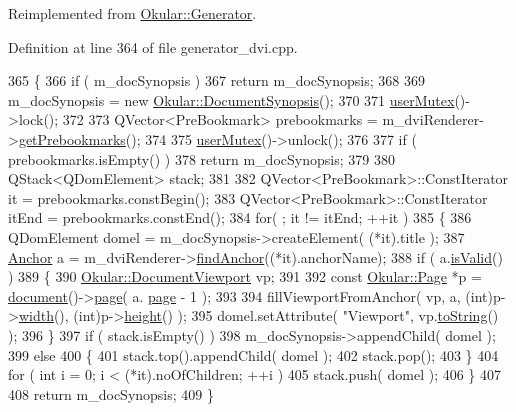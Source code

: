 Reimplemented from \hyperlink{classOkular_1_1Generator_a1f8b31c19d7a5101cadf3fe3186ab0f1}{Okular\+::\+Generator}.



Definition at line 364 of file generator\+\_\+dvi.\+cpp.


\begin{DoxyCode}
365 \{
366     \textcolor{keywordflow}{if} ( m\_docSynopsis )
367         \textcolor{keywordflow}{return} m\_docSynopsis;
368 
369     m\_docSynopsis = \textcolor{keyword}{new} \hyperlink{classOkular_1_1DocumentSynopsis}{Okular::DocumentSynopsis}();
370 
371     \hyperlink{classOkular_1_1Generator_a83d702cccbce2288c3258d97f1f15e19}{userMutex}()->lock();
372 
373     QVector<PreBookmark> prebookmarks = m\_dviRenderer->\hyperlink{classdviRenderer_aa59a29b870ae9a4ec30bfefdde940ca1}{getPrebookmarks}();
374 
375     \hyperlink{classOkular_1_1Generator_a83d702cccbce2288c3258d97f1f15e19}{userMutex}()->unlock();
376 
377     \textcolor{keywordflow}{if} ( prebookmarks.isEmpty() ) 
378         \textcolor{keywordflow}{return} m\_docSynopsis;
379 
380     QStack<QDomElement> stack;
381 
382     QVector<PreBookmark>::ConstIterator it = prebookmarks.constBegin();
383     QVector<PreBookmark>::ConstIterator itEnd = prebookmarks.constEnd();
384     \textcolor{keywordflow}{for}( ; it != itEnd; ++it ) 
385     \{
386         QDomElement domel = m\_docSynopsis->createElement( (*it).title );
387         \hyperlink{classAnchor}{Anchor} a = m\_dviRenderer->\hyperlink{classdviRenderer_a0f11aa712420cb39bf0909822a4e98bf}{findAnchor}((*it).anchorName);
388         \textcolor{keywordflow}{if} ( a.\hyperlink{classAnchor_a808ec5fc9d0075ca1c15cda24690277e}{isValid}() )
389         \{
390             \hyperlink{classOkular_1_1DocumentViewport}{Okular::DocumentViewport} vp;
391  
392             \textcolor{keyword}{const} \hyperlink{classOkular_1_1Page}{Okular::Page} *p = \hyperlink{classOkular_1_1Generator_a4248672ef04e62660d51f16c0a862bbe}{document}()->\hyperlink{classOkular_1_1Document_a1c95c2f192d739c217d00971da48f69d}{page}( a.
      \hyperlink{classAnchor_a6383150d7bcb2a7f0281274d17881aa2}{page} - 1 );
393 
394             fillViewportFromAnchor( vp, a, (\textcolor{keywordtype}{int})p->\hyperlink{classOkular_1_1Page_a57114e88281da2a51b1bb0d5d4996d53}{width}(), (int)p->\hyperlink{classOkular_1_1Page_a67246a32b3e625946eb5c685b8372a4f}{height}() );
395             domel.setAttribute( \textcolor{stringliteral}{"Viewport"}, vp.\hyperlink{classOkular_1_1DocumentViewport_a77e42e0c9502b91085cd25f845ecafa0}{toString}() );
396         \}
397         \textcolor{keywordflow}{if} ( stack.isEmpty() )
398             m\_docSynopsis->appendChild( domel );
399         \textcolor{keywordflow}{else} 
400         \{
401             stack.top().appendChild( domel );
402             stack.pop();
403         \}
404         \textcolor{keywordflow}{for} ( \textcolor{keywordtype}{int} i = 0; i < (*it).noOfChildren; ++i )
405             stack.push( domel );
406     \}
407 
408     \textcolor{keywordflow}{return} m\_docSynopsis;
409 \}
\end{DoxyCode}
